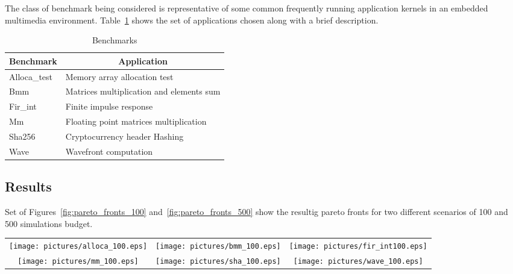 \begin{itemize}
The class of benchmark being considered is representative of some common
frequently running application kernels in an embedded multimedia
environment. Table~\ref{tab:bench} shows the set of applications
chosen along with a brief description.
\begin{table}
	\centering
	\caption{Benchmarks}
	\label{tab:bench}
	\begin{tabular}{ll}
	\hline
	\multicolumn{1}{c}{Benchmark} & \multicolumn{1}{c}{Application} \\
	\hline
	Alloca\_test & Memory array allocation test \\
	Bmm & Matrices multiplication and elements sum \\
	Fir\_int & Finite impulse response \\
	Mm & Floating point matrices multiplication \\
	Sha256 & Cryptocurrency header Hashing \\
	Wave & Wavefront computation \\
	\hline
	\end{tabular}
\end{table}

\subsection{Results}

Set of Figures~\ref{fig:pareto_fronts_100}
and~\ref{fig:pareto_fronts_500} show the resultig pareto fronts for two
different scenarios of 100 and 500 simulations budget.

\begin{table*}
  \centering
  \begin{tabular}{ccc}
    \texttt{[image: pictures/alloca\_100.eps]} &
    \texttt{[image: pictures/bmm\_100.eps]} & 
    \texttt{[image: pictures/fir\_int100.eps]} \\
    \texttt{[image: pictures/mm\_100.eps]} &
    \texttt{[image: pictures/sha\_100.eps]} &
    \texttt{[image: pictures/wave\_100.eps]} 
  \end{tabular}
  \caption{Pareto fronts found by PS and GA for a fixed budget of 100 configurations.}
  \label{fig:pareto_fronts_100}
\end{table*}


\end{itemize}
